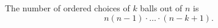 

\setcounter{section}{2}
\setcounter{subsection}{3}
\setcounter{dfn}{10}

\begin{thm}
The number of ordered choices of $k$ balls out of $n$ is
\[
n(n-1)\cdot \ldots \cdot (n-k+1).
\]
\end{thm}

